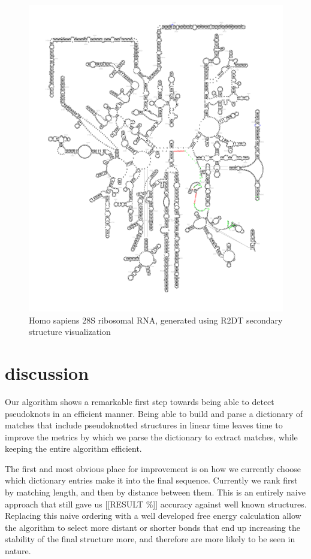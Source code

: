 \documentclass[sigconf]{acmart}
\begin{document}
\begin{figure}
  \includegraphics[width=\linewidth]{for_paper2.png}
  \caption{Homo sapiens 28S ribosomal RNA, generated using R2DT secondary structure visualization}
  \label{fig:ribosomal}
\end{figure}


\section{discussion}

Our algorithm shows a remarkable first step towards being able to detect pseudoknots in an efficient manner. Being able to build and parse a dictionary of matches that include pseudoknotted structures in linear time leaves time to improve the metrics by which we parse the dictionary to extract matches, while keeping the entire algorithm efficient. 

The first and most obvious place for improvement is on how we currently choose which dictionary entries make it into the final sequence. Currently we rank first by matching length, and then by distance between them. This is an entirely naive approach that still gave us [[RESULT \%]] accuracy against well known structures. Replacing this naive ordering with a well developed free energy calculation allow the algorithm to select more distant or shorter bonds that end up increasing the stability of the final structure more, and therefore are more likely to be seen in nature.
\end{document}

